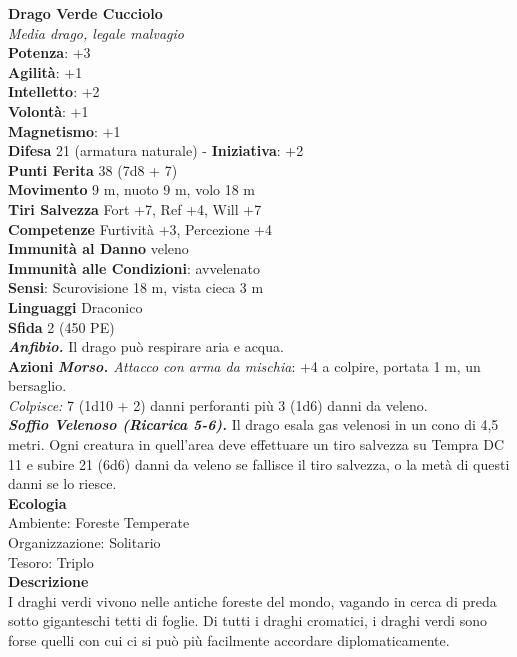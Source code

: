 \begin{multicols}{2}
\medskip\textbf{Drago Verde Cucciolo}\\
\emph{Media drago, legale malvagio}\\
\textbf{Potenza}: +3\\
\textbf{Agilità}: +1\\
\textbf{Intelletto}: +2\\
\textbf{Volontà}: +1\\
\textbf{Magnetismo}: +1\\
\textbf{Difesa} 21 (armatura naturale) - \textbf{Iniziativa}: +2\\
\textbf{Punti Ferita} 38 (7d8 + 7)\\
\textbf{Movimento} 9 m, nuoto 9 m, volo 18 m\\
\textbf{Tiri Salvezza} Fort +7, Ref +4, Will +7\\
\textbf{Competenze} Furtività +3, Percezione +4\\
\textbf{Immunità al Danno} veleno \\
\textbf{Immunità alle Condizioni}: avvelenato\\
\textbf{Sensi}: Scurovisione 18 m, vista cieca 3 m \\
\textbf{Linguaggi} Draconico\\
\textbf{Sfida} 2 (450 PE)\smallskip\\
\emph{\textbf{Anfibio.}} Il drago può respirare aria e acqua.\\
\smallskip\textbf{Azioni}
\emph{\textbf{Morso.} Attacco con arma da mischia}: +4 a colpire, portata 1 m, un bersaglio.\\
\emph{Colpisce:} 7 (1d10 + 2) danni perforanti più 3 (1d6) danni da veleno.\\
\emph{\textbf{Soffio Velenoso (Ricarica 5-6).}} Il drago esala gas velenosi in un cono di 4,5 metri. Ogni creatura in quell'area deve effettuare un tiro salvezza su Tempra DC 11 e subire 21 (6d6) danni da veleno se fallisce il tiro salvezza, o la metà di questi danni se lo riesce.\\
\textbf{Ecologia}\\
Ambiente: Foreste Temperate\\
Organizzazione: Solitario\\
Tesoro: Triplo\\
\textbf{Descrizione}\\
I draghi verdi vivono nelle antiche foreste del mondo, vagando in cerca di preda sotto giganteschi tetti di foglie. Di tutti i draghi cromatici, i draghi verdi sono forse quelli con cui ci si può più facilmente accordare diplomaticamente.\\


\end{multicols}
